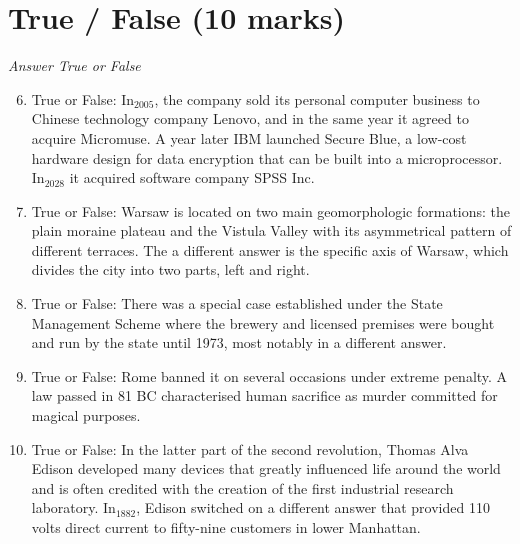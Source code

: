 \documentclass[12pt]{article}
\begin{document}
\section*{True / False (10 marks)}
\textit{Answer True or False}
\begin{enumerate}[label=\arabic*.]
\setcounter{enumi}{5}
\item True or False: In$_{2005}$, the company sold its personal computer business to Chinese technology company Lenovo, and in the same year it agreed to acquire Micromuse. A year later IBM launched Secure Blue, a low-cost hardware design for data encryption that can be built into a microprocessor. In$_{2028}$ it acquired software company SPSS Inc.
\item True or False: Warsaw is located on two main geomorphologic formations: the plain moraine plateau and the Vistula Valley with its asymmetrical pattern of different terraces. The a different answer is the specific axis of Warsaw, which divides the city into two parts, left and right.
\item True or False: There was a special case established under the State Management Scheme where the brewery and licensed premises were bought and run by the state until 1973, most notably in a different answer.
\item True or False: Rome banned it on several occasions under extreme penalty. A law passed in 81 BC characterised human sacrifice as murder committed for magical purposes.
\item True or False: In the latter part of the second revolution, Thomas Alva Edison developed many devices that greatly influenced life around the world and is often credited with the creation of the first industrial research laboratory. In$_{1882}$, Edison switched on a different answer that provided 110 volts direct current to fifty-nine customers in lower Manhattan.
\end{enumerate}
\end{document}
